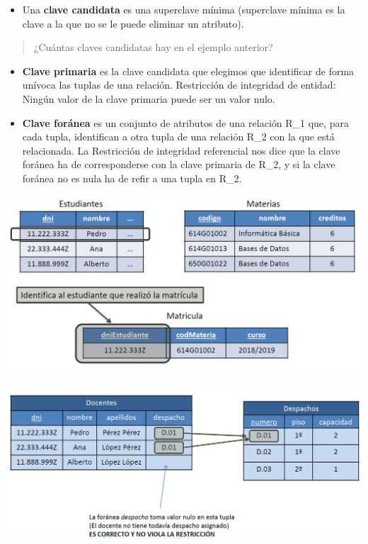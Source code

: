 \documentclass[
]{book}
\providecommand{\tightlist}{%
  \setlength{\itemsep}{0pt}\setlength{\parskip}{0pt}}
\begin{document}
\begin{itemize}
\tightlist
\item
  Una \textbf{clave candidata} es una superclave mínima (superclave mínima es la clave a la que no se le puede eliminar un atributo).
\end{itemize}

\begin{quote}
¿Cuántas claves candidatas hay en el ejemplo anterior?
\end{quote}

\begin{itemize}
\item
  \textbf{Clave primaria} es la clave candidata que elegimos que identificar de forma unívoca las tuplas de una relación. Restricción de integridad de entidad: Ningún valor de la clave primaria puede ser un valor nulo.
\item
  \textbf{Clave foránea} es un conjunto de atributos de una relación R\_1 que, para cada tupla, identifican a otra tupla de una relación R\_2 con la que está relacionada.
  La Restricción de integridad referencial nos dice que la clave foránea ha de corresponderse con la clave primaria de R\_2, y si la clave foránea no es nula ha de refir a una tupla en R\_2.
\end{itemize}

\includegraphics[width=6.25in,height=\textheight]{images/ClaveForanea.png}

\includegraphics[width=6.25in,height=\textheight]{images/IntegridadReferencial.png}
\end{document}
